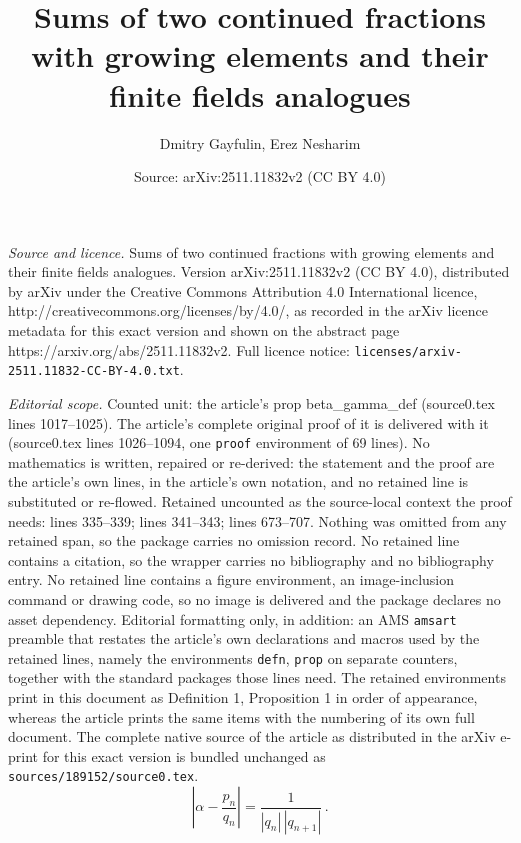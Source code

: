 \documentclass[10pt,a4paper]{amsart}
\title{Sums of two continued fractions with growing elements and their finite fields analogues}
\author{Dmitry Gayfulin, Erez Nesharim}
\date{Source: arXiv:2511.11832v2 (CC BY 4.0)}
\begin{document}
\maketitle

\noindent\emph{Source and licence.} Sums of two continued fractions with growing elements and their finite fields analogues. Version arXiv:2511.11832v2 (CC BY 4.0), distributed by arXiv under the Creative Commons Attribution 4.0 International licence, http://creativecommons.org/licenses/by/4.0/, as recorded in the arXiv licence metadata for this exact version and shown on the abstract page https://arxiv.org/abs/2511.11832v2. Full licence notice: \texttt{licenses/arxiv-2511.11832-CC-BY-4.0.txt}.\par\smallskip

\noindent\textit{Editorial scope.} Counted unit: the article's prop beta\_gamma\_def (source0.tex lines 1017--1025). The article's complete original proof of it is delivered with it (source0.tex lines 1026--1094, one \texttt{proof} environment of 69 lines). No mathematics is written, repaired or re-derived: the statement and the proof are the article's own lines, in the article's own notation, and no retained line is substituted or re-flowed.  Retained uncounted as the source-local context the proof needs: lines 335--339; lines 341--343; lines 673--707.  Nothing was omitted from any retained span, so the package carries no omission record.  No retained line contains a citation, so the wrapper carries no bibliography and no bibliography entry.  No retained line contains a figure environment, an image-inclusion command or drawing code, so no image is delivered and the package declares no asset dependency.  Editorial formatting only, in addition: an AMS \texttt{amsart} preamble that restates the article's own declarations and macros used by the retained lines, namely the environments \texttt{defn}, \texttt{prop} on separate counters, together with the standard packages those lines need.  The retained environments print in this document as Definition 1, Proposition 1 in order of appearance, whereas the article prints the same items with the numbering of its own full document.  The complete native source of the article as distributed in the arXiv e-print for this exact version is bundled unchanged as \texttt{sources/189152/source0.tex}.
\begin{equation}\label{eq:common3}
\left|\alpha-\frac{p_n}{q_n} \right|=\frac{1}{|q_n|\,|q_{n+1}|}\,.
\end{equation}
\end{document}

